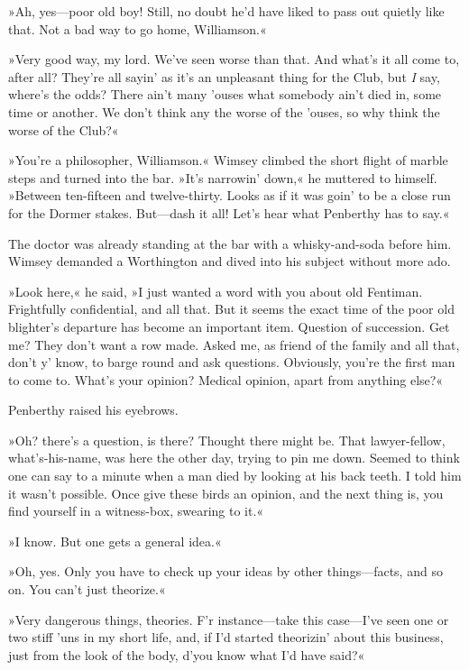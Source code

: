 »Ah, yes\allowbreak---\allowbreak poor old boy! Still, no doubt he'd have liked to pass out quietly like that. Not a bad way to go home, Williamson.«

»Very good way, my lord. We've seen worse than that. And what's it all come to, after all? They're all sayin' as it's an unpleasant thing for the Club, but \textit{I} say, where's the odds? There ain't many 'ouses what somebody ain't died in, some time or another. We don't think any the worse of the 'ouses, so why think the worse of the Club?«

»You're a philosopher, Williamson.« Wimsey climbed the short flight of marble steps and turned into the bar. »It's narrowin' down,« he muttered to himself. »Between ten-fifteen and twelve-thirty. Looks as if it was goin' to be a close run for the Dormer stakes. But\allowbreak---\allowbreak dash it all! Let's hear what Penberthy has to say.«

The doctor was already standing at the bar with a whisky-and-soda before him. Wimsey demanded a Worthington and dived into his subject without more ado.

»Look here,« he said, »I just wanted a word with you about old Fentiman. Frightfully confidential, and all that. But it seems the exact time of the poor old blighter's departure has become an important item. Question of succession. Get me? They don't want a row made. Asked me, as friend of the family and all that, don't y' know, to barge round and ask questions. Obviously, you're the first man to come to. What's your opinion? Medical opinion, apart from anything else?«

Penberthy raised his eyebrows.

»Oh? there's a question, is there? Thought there might be. That lawyer-fellow, what's-his-name, was here the other day, trying to pin me down. Seemed to think one can say to a minute when a man died by looking at his back teeth. I told him it wasn't possible. Once give these birds an opinion, and the next thing is, you find yourself in a witness-box, swearing to it.«

»I know. But one gets a general idea.«

»Oh, yes. Only you have to check up your ideas by other things\allowbreak---\allowbreak facts, and so on. You can't just theorize.«

»Very dangerous things, theories. F'r instance\allowbreak---\allowbreak take this case\allowbreak---\allowbreak I've seen one or two stiff 'uns in my short life, and, if I'd started theorizin' about this business, just from the look of the body, d'you know what I'd have said?«

